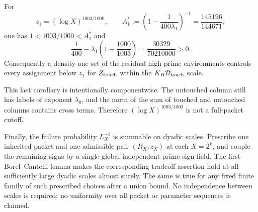 \begin{corollary}
\label{cor:tpc45-touched-improved-cutoff}
For
\begin{equation}
 z_1=(\log X)^{1003/1000},
 \qquad
 A_1^*
 :=\left(1-\frac1{400\lambda_1}\right)^{-1}
 =\frac{145196}{144671},
 \label{eq:tpc45-touched-A-star}
\end{equation}
one has \(1<1003/1000<A_1^*\) and
\begin{equation}
 \frac1{400}
 -\lambda_1\left(1-\frac{1000}{1003}\right)
 =\frac{30329}{70210000}>0.
 \label{eq:tpc45-touched-cutoff-gap}
\end{equation}
Consequently a density-one set of the residual high-prime environments
controls every assignment below \(z_1\) for \(Z_{\rm touch}\) within
the \(K_B\mathcal D_{\rm touch}\) scale.
\end{corollary}

This last corollary is intentionally componentwise.  The untouched
column still has labels of exponent \(\lambda_0\), and the norm of the
sum of touched and untouched columns contains cross terms.  Therefore
\((\log X)^{1003/1000}\) is not a full-packet cutoff.

Finally, the failure probability \(L_X^{-1}\) is summable on dyadic
scales.  Prescribe one inherited packet and one admissible pair
\((R_X,z_X)\) at each \(X=2^k\), and couple the remaining signs by a
single global independent prime-sign field.  The first
Borel--Cantelli lemma makes the corresponding tradeoff assertion hold
at all sufficiently large dyadic scales almost surely.  The same is
true for any fixed finite family of such prescribed choices after a
union bound.  No independence between scales is required; no
uniformity over all packet or parameter sequences is claimed.
